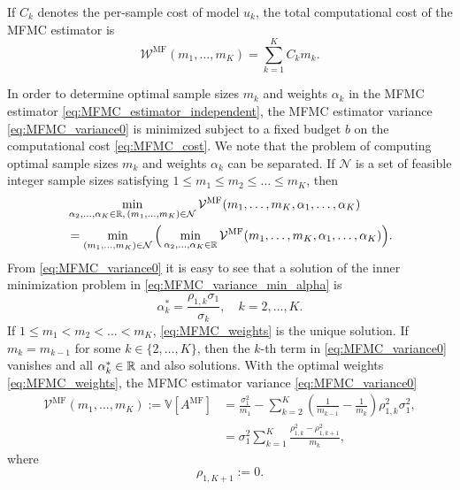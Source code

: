 If $C_k$ denotes the per-sample cost of model $u_k$, the total computational cost of the MFMC estimator  is 
\begin{equation}\label{eq:MFMC_cost}
        \mathcal{W}^{\text{MF}}(m_1, \ldots, m_K)  = \sum_{k=1}^K C_k m_k.
\end{equation}



In order to determine optimal sample sizes $m_k$ and weights $\alpha_k$ in the MFMC estimator \eqref{eq:MFMC_estimator_independent}, the MFMC estimator  variance \eqref{eq:MFMC_variance0} 
is minimized subject to a fixed budget $b$ on the computational cost \eqref{eq:MFMC_cost}.
We note that the problem of computing optimal sample sizes $m_k$ and weights $\alpha_k$ 
can be separated. 
If ${\mathcal N}$ is a set of feasible integer sample sizes satisfying $1 \le m_1 \le m_2 \le \ldots \le m_K$,
then
\begin{align}   \label{eq:MFMC_variance_min_alpha}
    & \min_{\alpha_2, \ldots, \alpha_K \in \mathbb{R},\, (m_1, \ldots, m_K) \in {\mathcal N}} 
           \mathcal{V}^{\text{MF}}(m_1, \ldots, m_K, \alpha_1, \ldots, \alpha_K)                \nonumber \\
    & = \min_{(m_1, \ldots, m_K) \in {\mathcal N}} 
          \Big( \min_{\alpha_2, \ldots, \alpha_K \in \mathbb{R}} 
                       \mathcal{V}^{\text{MF}}(m_1, \ldots, m_K, \alpha_1, \ldots, \alpha_K)\Big).
\end{align}
From \eqref{eq:MFMC_variance0} it is easy to see that a solution of the  inner minimization problem in
\eqref{eq:MFMC_variance_min_alpha} is
\begin{equation}   \label{eq:MFMC_weights}
    \alpha_k^* = \frac{\rho_{1,k}\sigma_1}{\sigma_k}, \quad k= 2, \ldots, K.
\end{equation}
If $1 \le m_1 < m_2 < \ldots < m_K$, \eqref{eq:MFMC_weights} is the unique solution.
If $m_k = m_{k-1}$ for some $k \in \{ 2, \ldots, K \}$, then the $k$-th term in  \eqref{eq:MFMC_variance0} 
vanishes and all $\alpha_k^* \in \mathbb{R}$ and also solutions.
With the optimal weights \eqref{eq:MFMC_weights}, the MFMC estimator  variance \eqref{eq:MFMC_variance0} 
\begin{subequations}  \label{eq:MFMC_variance}
\begin{align}
    \mathcal{V}^{\text{MF}}(m_1, \ldots, m_K)
    :=  \mathbb{V}[A^{\text{MF}}]
   &= \frac{\sigma_1^2}{m_1} 
       - \sum_{k=2}^K \left(\frac{1}{m_{k-1}} - \frac{1}{m_k}\right) \rho_{1,k}^2 \sigma_1^2,   \label{eq:MFMC_variance_a} \\
  &= \sigma_1^2\sum_{k=1}^K \frac{ \rho_{1,k}^2 - \rho_{1,k+1}^2}{m_k},           \label{eq:MFMC_variance_b}
\end{align}
\end{subequations}
where 
\[
                 \rho_{1,K+1} :=0.
\]

